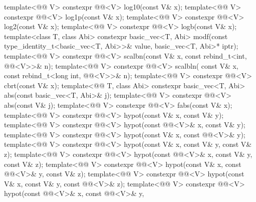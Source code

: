 \begin{codeblock}
{  template<@@ V> constexpr @@<V> log10(const V& x);
  template<@@ V> constexpr @@<V> log1p(const V& x);
  template<@@ V> constexpr @@<V> log2(const V& x);
  template<@@ V> constexpr @@<V> logb(const V& x);
  template<class T, class Abi>
    constexpr basic_vec<T, Abi>
      modf(const type_identity_t<basic_vec<T, Abi>>& value, basic_vec<T, Abi>* iptr);
  template<@@ V>
    constexpr @@<V> scalbn(const V& x, const rebind_t<int, @@<V>>& n);
  template<@@ V>
    constexpr @@<V> scalbln(
      const V& x, const rebind_t<long int, @@<V>>& n);
  template<@@ V> constexpr @@<V> cbrt(const V& x);
  template<@@ T, class Abi>
    constexpr basic_vec<T, Abi> abs(const basic_vec<T, Abi>& j);
  template<@@ V> constexpr @@<V> abs(const V& j);
  template<@@ V> constexpr @@<V> fabs(const V& x);
  template<@@ V>
    constexpr @@<V> hypot(const V& x, const V& y);
  template<@@ V>
    constexpr @@<V> hypot(const @@<V>& x, const V& y);
  template<@@ V>
    constexpr @@<V> hypot(const V& x, const @@<V>& y);
  template<@@ V>
    constexpr @@<V> hypot(const V& x, const V& y, const V& z);
  template<@@ V>
    constexpr @@<V> hypot(const @@<V>& x, const V& y, const V& z);
  template<@@ V>
    constexpr @@<V> hypot(const V& x, const @@<V>& y, const V& z);
  template<@@ V>
    constexpr @@<V> hypot(const V& x, const V& y, const @@<V>& z);
  template<@@ V>
    constexpr @@<V> hypot(const @@<V>& x, const @@<V>& y,
}
\end{codeblock}
